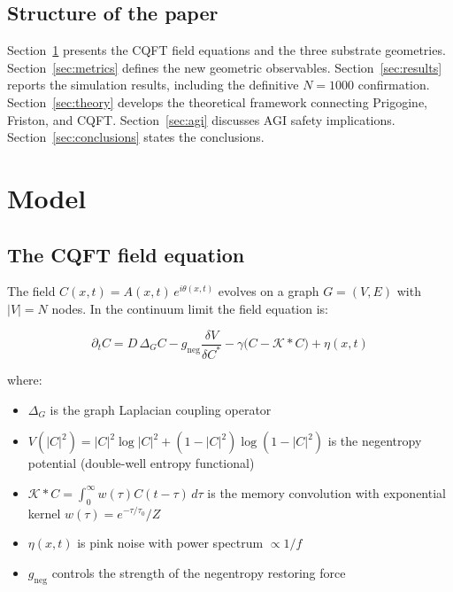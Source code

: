\documentclass[12pt,a4paper]{article}
\theoremstyle{plain}
\theoremstyle{definition}
\begin{document}
\subsection{Structure of the paper}

Section~\ref{sec:model} presents the CQFT field equations and the three
substrate geometries. Section~\ref{sec:metrics} defines the new geometric
observables. Section~\ref{sec:results} reports the simulation results,
including the definitive $N=1000$ confirmation. Section~\ref{sec:theory} develops the theoretical framework connecting Prigogine, Friston, and CQFT. Section~\ref{sec:agi} discusses AGI safety
implications. Section~\ref{sec:conclusions} states the conclusions.

\section{Model}
\label{sec:model}

\subsection{The CQFT field equation}

The field $C(x,t) = A(x,t)\,e^{i\theta(x,t)}$ evolves on a graph
$G = (V, E)$ with $|V| = N$ nodes. In the continuum limit the field
equation is:

\begin{equation}
\label{eq:field}
\partial_t C = D\,\Delta_G C
  - g_{\text{neg}}\frac{\delta V}{\delta C^*}
  - \gamma\bigl(C - \mathcal{K} * C\bigr)
  + \eta(x,t)
\end{equation}

where:
\begin{itemize}[noitemsep]
  \item $\Delta_G$ is the graph Laplacian coupling operator
  \item $V(|C|^2) = |C|^2\log|C|^2 + (1-|C|^2)\log(1-|C|^2)$ is the
    negentropy potential (double-well entropy functional)
  \item $\mathcal{K} * C = \int_0^\infty w(\tau)C(t-\tau)\,d\tau$ is the
    memory convolution with exponential kernel $w(\tau) = e^{-\tau/\tau_0}/Z$
  \item $\eta(x,t)$ is pink noise with power spectrum $\propto 1/f$
  \item $g_{\text{neg}}$ controls the strength of the negentropy restoring force
\end{itemize}
\end{document}
